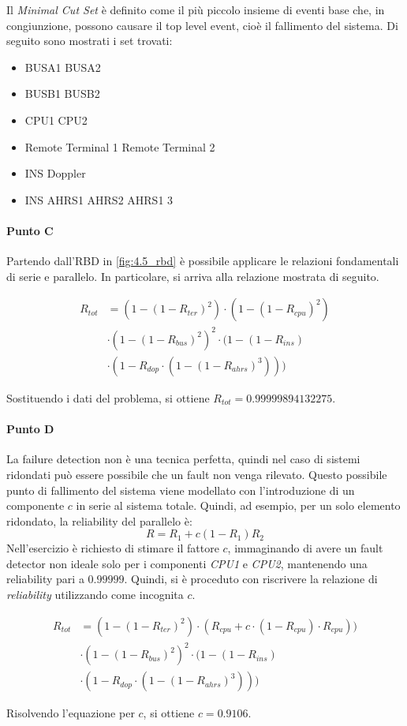 Il \textit{Minimal Cut Set} è definito come il più piccolo insieme di eventi base che, in congiunzione, possono causare il top level event, cioè il fallimento del sistema.
Di seguito sono mostrati i set trovati:
\begin{itemize}
    \item BUSA1 \land BUSA2
    \item BUSB1 \land BUSB2
    \item CPU1 \land CPU2
    \item Remote Terminal 1 \land Remote Terminal 2
    \item INS \land Doppler
    \item INS \land AHRS1 \land AHRS2 \land AHRS1 3
\end{itemize}

\paragraph{Punto C}
Partendo dall'RBD in \cref{fig:4.5_rbd} è possibile applicare le relazioni fondamentali di serie e parallelo. In particolare, si arriva alla relazione mostrata di seguito.

\begin{align*}
    R_{tot}&=(1-(1-R_{ter})^2) \cdot (1-(1-R_{cpu})^2)\\
    &\cdot(1-(1-R_{bus})^2)^2\cdot(1-(1-R_{ins})\\
    &\cdot(1-R_{dop}\cdot(1-(1-R_{ahrs})^3)))
\end{align*}

Sostituendo i dati del problema, si ottiene $R_{tot} = 0.99999894132275$.

\paragraph{Punto D}

La failure detection non è una tecnica perfetta, quindi nel caso di sistemi ridondati può essere possibile che un fault non venga rilevato. Questo possibile punto di fallimento del sistema viene modellato con l'introduzione di un componente $c$ in serie al sistema totale. Quindi, ad esempio, per un solo elemento ridondato, la reliability del parallelo è:
\begin{equation*}
    R = R_1 + c ( 1 - R_1)R_2
\end{equation*}
Nell'esercizio è richiesto di stimare il fattore $c$, immaginando di avere un fault detector non ideale solo per i componenti \textit{CPU1} e \textit{CPU2}, mantenendo una reliability pari a $0.99999$. Quindi, si è proceduto con riscrivere la relazione di \textit{reliability} utilizzando come incognita $c$.

\begin{align*}
    R_{tot}&=(1-(1-R_{ter})^2) \cdot (R_{cpu}+ c \cdot (1-R_{cpu}) \cdot R_{cpu}))\\
    \label{eq:rel_fault_coverage}
    &\cdot(1-(1-R_{bus})^2)^2\cdot(1-(1-R_{ins})\\
    &\cdot(1-R_{dop}\cdot(1-(1-R_{ahrs})^3)))
\end{align*}

Risolvendo l'equazione per $c$, si ottiene $c = 0.9106$.
